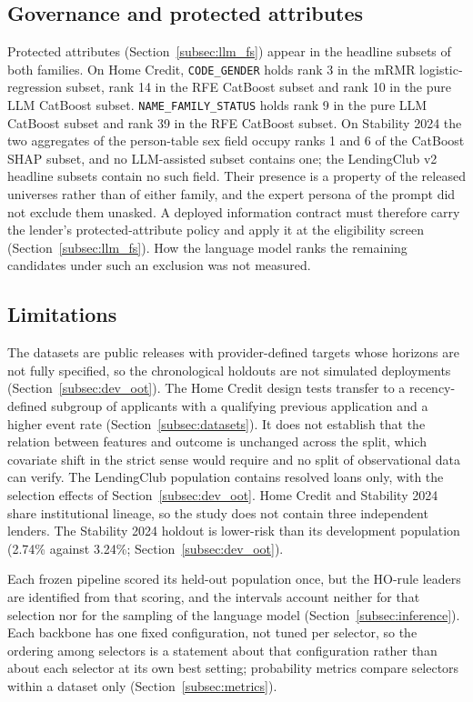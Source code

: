 \documentclass[final,5p,twocolumn]{elsarticle}
\begin{document}
\subsection{Governance and protected attributes}
\label{subsec:governance}

Protected attributes (Section~\ref{subsec:llm_fs}) appear in the headline subsets of both families. On Home Credit, \texttt{CODE\_GENDER} holds rank 3 in the mRMR logistic-regression subset, rank 14 in the RFE CatBoost subset and rank 10 in the pure LLM CatBoost subset. \texttt{NAME\_FAMILY\_STATUS} holds rank 9 in the pure LLM CatBoost subset and rank 39 in the RFE CatBoost subset. On Stability 2024 the two aggregates of the person-table sex field occupy ranks 1 and 6 of the CatBoost SHAP subset, and no LLM-assisted subset contains one; the LendingClub v2 headline subsets contain no such field. Their presence is a property of the released universes rather than of either family, and the expert persona of the prompt did not exclude them unasked. A deployed information contract must therefore carry the lender's protected-attribute policy and apply it at the eligibility screen (Section~\ref{subsec:llm_fs}). How the language model ranks the remaining candidates under such an exclusion was not measured.

\subsection{Limitations}
\label{subsec:limitations}

The datasets are public releases with provider-defined targets whose horizons are not fully specified, so the chronological holdouts are not simulated deployments (Section~\ref{subsec:dev_oot}). The Home Credit design tests transfer to a recency-defined subgroup of applicants with a qualifying previous application and a higher event rate (Section~\ref{subsec:datasets}). It does not establish that the relation between features and outcome is unchanged across the split, which covariate shift in the strict sense would require and no split of observational data can verify. The LendingClub population contains resolved loans only, with the selection effects of Section~\ref{subsec:dev_oot}. Home Credit and Stability 2024 share institutional lineage, so the study does not contain three independent lenders. The Stability 2024 holdout is lower-risk than its development population (2.74\% against 3.24\%; Section~\ref{subsec:dev_oot}).

Each frozen pipeline scored its held-out population once, but the HO-rule leaders are identified from that scoring, and the intervals account neither for that selection nor for the sampling of the language model (Section~\ref{subsec:inference}). Each backbone has one fixed configuration, not tuned per selector, so the ordering among selectors is a statement about that configuration rather than about each selector at its own best setting; probability metrics compare selectors within a dataset only (Section~\ref{subsec:metrics}).
\end{document}
